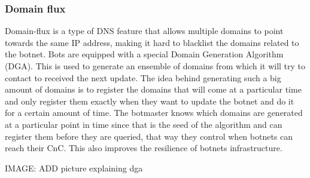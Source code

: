 \subsubsection{Domain flux}
Domain-flux is a type of DNS feature that allows multiple domains to point towards the same IP address, making it hard to blacklist the domains related to the botnet. Bots are equipped with a special Domain Generation Algorithm (DGA). This is used to generate an ensemble of domains from which it will try to contact to received the next update. The idea behind generating such a big amount of domains is to register the domains that will come at a particular time and only register them exactly when they want to update the botnet and do it for a certain amount of time. The botmaster knows which domains are generated at a particular point in time since that is the seed of the algorithm and can register them before they are queried, that way they control when botnets can reach their CnC. This also improves the resilience of botnets infrastructure.

IMAGE: ADD picture explaining dga

\cite{bot-com}
